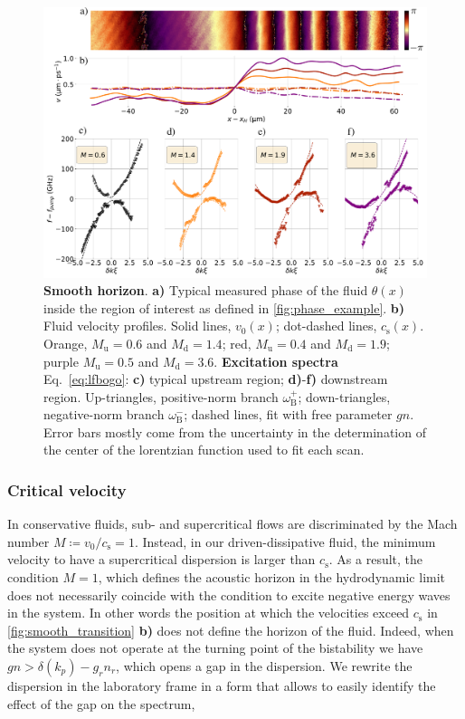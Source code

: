 \begin{figure}
    \centering
    \includegraphics[width=1\textwidth]{chap_custom_st/fig/bh_smooth.pdf}
    \caption{\textbf{Smooth horizon}.
    \textbf{a)} Typical measured phase of the fluid $\theta(x)$ inside the region of interest as defined in \autoref{fig:phase_example}.
    \textbf{\textbf{b)}} Fluid velocity profiles.
    Solid lines, $v_0(x)$; dot-dashed lines, $c_\mathrm{s}(x)$. Orange, $M_\mathrm{u}=0.6$ and $M_\mathrm{d}=1.4$; red, $M_\mathrm{u}=0.4$ and $M_\mathrm{d}=1.9$; purple $M_\mathrm{u}=0.5$ and $M_\mathrm{d}=3.6$.
    \textbf{Excitation spectra} Eq.~\eqref{eq:lfbogo}: \textbf{c)} typical upstream region; \textbf{d)}-\textbf{f)} downstream region.
    Up-triangles, positive-norm branch $\omega_\mathrm{B}^+$; down-triangles, negative-norm branch $\omega_\mathrm{B}^-$; dashed lines, fit with free parameter $gn$. Error bars mostly come from the uncertainty in the determination
    of the center of the lorentzian function used to fit each scan.
    \label{fig:smooth_transition}}
\end{figure}




\subsubsection{Critical velocity} In conservative fluids, sub- and supercritical flows are discriminated by the Mach number $M\coloneqq v_0/c_\mathrm{s}=1$.
Instead, in our driven-dissipative fluid, the minimum velocity to have a supercritical dispersion is larger than $c_\mathrm{s}$.
As a result, the condition $M=1$, which defines the acoustic horizon in the hydrodynamic limit does not necessarily coincide with the condition to excite negative energy waves in the system. In other words the position at 
which the velocities exceed $c_\mathrm{s}$ in \autoref{fig:smooth_transition} \textbf{b)} does not define the horizon of the fluid. Indeed, when the system does not operate at the turning
point of the bistability we have $gn>\delta(k_p)-g_rn_r$, which opens a gap in the dispersion. We rewrite the dispersion in the laboratory frame in a form that allows to easily identify the effect of the gap on the spectrum,


